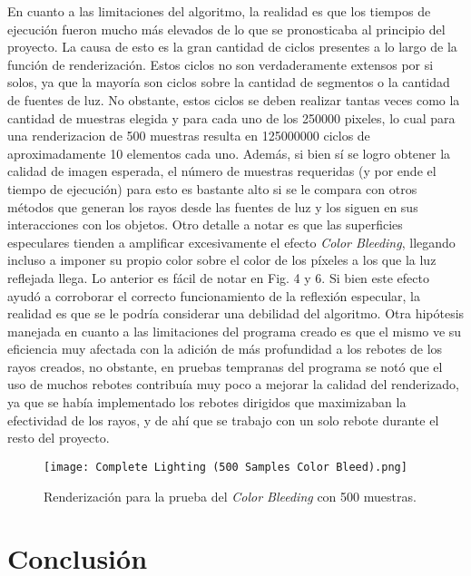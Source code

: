 \documentclass[conference]{IEEEtran}
\begin{document}
En cuanto a las limitaciones del algoritmo, la realidad es que los tiempos de ejecución fueron mucho más elevados de lo que se pronosticaba al principio del proyecto. La causa de esto es la gran cantidad de ciclos presentes a lo largo de la función de renderización. Estos ciclos no son verdaderamente extensos por si solos, ya que la mayoría son ciclos sobre la cantidad de segmentos o la cantidad de fuentes de luz. No obstante, estos ciclos se deben realizar tantas veces como la cantidad de muestras elegida y para cada uno de los 250000 pixeles, lo cual para una renderizacion de 500 muestras resulta en 125000000 ciclos de aproximadamente 10 elementos cada uno. Además, si bien sí se logro obtener la calidad de imagen esperada, el número de muestras requeridas (y por ende el tiempo de ejecución) para esto es bastante alto si se le compara con otros métodos que generan los rayos desde las fuentes de luz y los siguen en sus interacciones con los objetos. Otro detalle a notar es que las superficies especulares tienden a amplificar excesivamente el efecto \textit{Color Bleeding}, llegando incluso a imponer su propio color sobre el color de los píxeles a los que la luz reflejada llega. Lo anterior es fácil de notar en Fig. 4 y 6. Si bien este efecto ayudó a corroborar el correcto funcionamiento de la reflexión especular, la realidad es que se le podría considerar una debilidad del algoritmo. Otra hipótesis manejada en cuanto a las limitaciones del programa creado es que el mismo ve su eficiencia muy afectada con la adición de más profundidad a los rebotes de los rayos creados, no obstante, en pruebas tempranas del programa se notó que el uso de muchos rebotes contribuía muy poco a mejorar la calidad del renderizado, ya que se había implementado los rebotes dirigidos que maximizaban la efectividad de los rayos, y de ahí que se trabajo con un solo rebote durante el resto del proyecto. 

\begin{figure}[htbp]
\centerline{\texttt{[image: Complete Lighting (500 Samples Color Bleed).png]}}
\caption{Renderización para la prueba del \textit{Color Bleeding} con 500 muestras.}
\label{500 muestras color bleeding.}
\end{figure}

\section{Conclusión}
\end{document}

